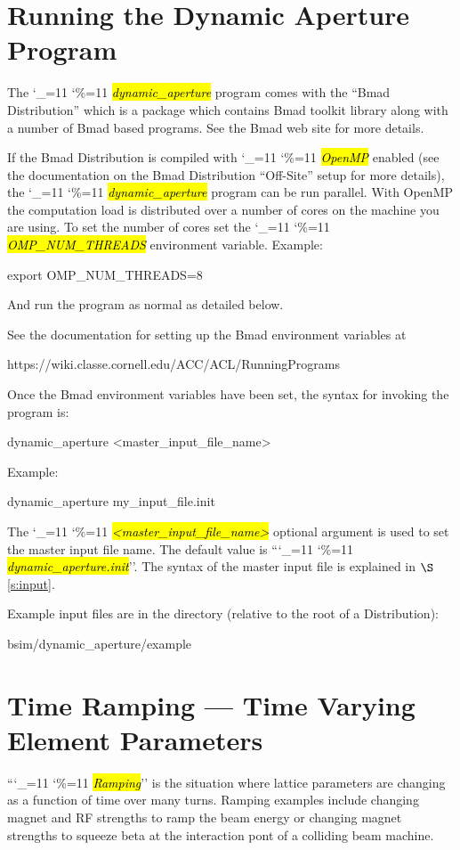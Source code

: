 \documentclass{hitec}
\newcommand\dottcmd[1]{\hl{\em#1}\endgroup}
\newcommand{\vn}{\begingroup\catcode`\_=11 \catcode`\%=11 \dottcmd}
\newcommand{\da}{\vn{dynamic_aperture}\xspace}
\newcommand{\sref}[1]{$\S$\ref{#1}}
\newcommand{\Section}[1]{\section{#1}\vspace*{-1ex}}
\begin{document}
\Section{Running the Dynamic Aperture Program} 
\label{s:run}

The \da program comes with the ``Bmad Distribution'' which is a package which contains Bmad toolkit
library along with a number of Bmad based programs. See the Bmad web site for more details.

If the Bmad Distribution is compiled with \vn{OpenMP} enabled (see the documentation on the Bmad
Distribution ``Off-Site'' setup for more details), the \da program can be run parallel. With OpenMP
the computation load is distributed over a number of cores on the machine you are using. To set the
number of cores set the \vn{OMP_NUM_THREADS} environment variable. Example:
\begin{code}
export OMP_NUM_THREADS=8
\end{code}
And run the program as normal as detailed below.

See the documentation for setting up the Bmad environment variables at
\begin{code}
  https://wiki.classe.cornell.edu/ACC/ACL/RunningPrograms
\end{code}

Once the Bmad environment variables have been set, the syntax for invoking the program is:
\begin{code}
  dynamic_aperture {<master_input_file_name>}
\end{code}
Example:
\begin{code}
  dynamic_aperture my_input_file.init
\end{code}
The \vn{<master_input_file_name>} optional argument is used to set the master input file name. The
default value is ``\vn{dynamic_aperture.init}''. The syntax of the master input file is explained
in \sref{s:input}.

Example input files are in the directory (relative to the root of a Distribution):
\begin{code}
  bsim/dynamic_aperture/example
\end{code}

\Section{Time Ramping --- Time Varying Element Parameters}
\label{s:ramp}

``\vn{Ramping}'' is the situation where lattice parameters are changing as a function of time over
many turns. Ramping examples include changing magnet and RF strengths to ramp the beam energy or
changing magnet strengths to squeeze beta at the interaction pont of a colliding beam machine.
\end{document}
